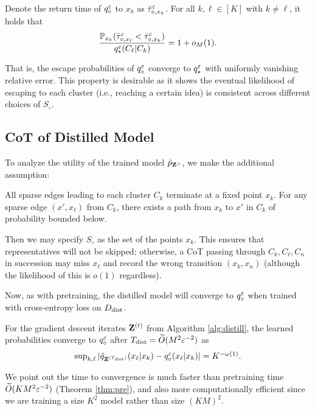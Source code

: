 \begin{prop}\label{thm:53}
Denote the return time of $q_\circ^\varepsilon$ to $x_k$ as $\bar{\tau}_{\circ,x_k}^\varepsilon$. For all $k,\ell\in[K]$ with $k\neq\ell$, it holds that
\begin{equation*}
\frac{\mathbb{P}_{x_k}(\bar{\tau}_{\circ,x_\ell}^\varepsilon < \bar{\tau}_{\circ,x_k}^\varepsilon)}{q_\star^\varepsilon(C_\ell|C_k)} = 1+o_M(1).
\end{equation*}
\end{prop}
That is, the escape probabilities of $q_\circ^\varepsilon$ converge to $q_\star^\varepsilon$ with uniformly vanishing relative error. This property is desirable as it shows the eventual likelihood of escaping to each cluster (i.e., reaching a certain idea) is consistent across different choices of $S_\circ$.

\subsection{CoT of Distilled Model}

To analyze the utility of the trained model $\hat{p}_{\mathbf{Z}^+}$, we make the additional assumption:

\begin{ass}\label{ass:in}
All sparse edges leading to each cluster $C_k$ terminate at a fixed point $x_k$. For any sparse edge $(x',x_\ell)$ from $C_k$, there exists a path from $x_k$ to $x'$ in $C_k$ of probability bounded below.
\end{ass}

Then we may specify $S_\circ$ as the set of the points $x_k$. This ensures that representatives will not be skipped; otherwise, a CoT passing through $C_k,C_\ell,C_n$ in succession may miss $x_\ell$ and record the wrong transition $(x_k, x_n)$ (although the likelihood of this is $o(1)$ regardless).

Now, as with pretraining, the distilled model will converge to $q_\circ^\varepsilon$ when trained with cross-entropy loss on $D_{\operatorname{dist}}$.

\begin{prop}\label{thm:unchained}
For the gradient descent iterates $\mathbf{Z}^{(t)}$ from Algorithm \ref{alg:distill}, the learned probabilities converge to $q_\circ^\varepsilon$ after $T_{\operatorname{dist}} = \widetilde{O}(M^2\varepsilon^{-2})$ as
\begin{equation*}
\textstyle \sup_{k,\ell}|\hat{q}_{\mathbf{Z}^{(T_{\operatorname{dist}})}}(x_\ell|x_k) - q_\circ^\varepsilon(x_\ell|x_k)|= K^{-\omega(1)}.
\end{equation*}
\end{prop}
We point out the time to convergence is much faster than pretraining time $\widetilde{O}(KM^2\varepsilon^{-2})$ (Theorem \ref{thm:pre}), and also more computationally efficient since we are training a size $K^2$ model rather than size $(KM)^2$.


